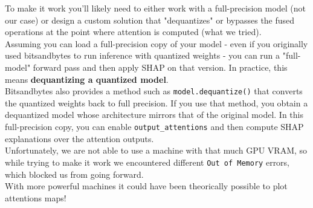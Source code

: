 \documentclass[12pt]{article}
\begin{document}
To make it work you’ll likely need to either work with a full-precision model (not our case) or design a custom solution that "dequantizes" or bypasses the fused operations at the point where attention is computed (what we tried).\vspace{14pt}\\
Assuming you can load a full-precision copy of your model - even if you originally used bitsandbytes to run inference with quantized weights - you can run a "full-model" forward pass and then apply SHAP on that version. In practice, this means \textbf{dequantizing a quantized model}.\\
Bitsandbytes also provides a method such as \texttt{model.dequantize()} that converts the quantized weights back to full precision. If you use that method, you obtain a dequantized model whose architecture mirrors that of the original model. In this full-precision copy, you can enable \texttt{output\_attentions} and then compute SHAP explanations over the attention outputs.\vspace{14pt}\\
Unfortunately, we are not able to use a machine with that much GPU VRAM, so while trying to make it work we encountered different \texttt{Out of Memory} errors, which blocked us from going forward.\vspace{14pt}\\
With more powerful machines it could have been theorically possible to plot attentions maps!
\end{document}
